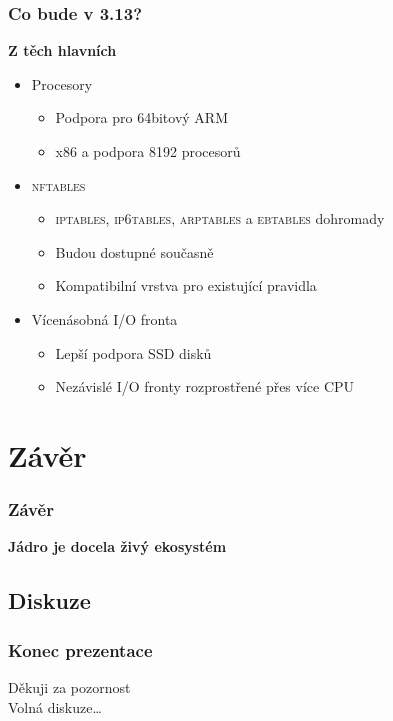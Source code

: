 \documentclass[xcolor=dvipsnames,handout]{beamer}
\newcommand{\heading}[1]{\textbf{\textcolor{BurntOrange}{#1}}}
\begin{document}
\begin{frame}
  \frametitle{Co bude v 3.13?}

  \heading{Z těch hlavních}
  \begin{itemize}
    \item Procesory
    \begin{itemize}
      \item Podpora pro 64bitový ARM
      \item x86 a podpora 8192 procesorů
    \end{itemize}

    \pause

    \item \textsc{nftables}
    \begin{itemize}
      \item \textsc{iptables}, \textsc{ip6tables}, \textsc{arptables} a
	\textsc{ebtables} dohromady
      \item Budou dostupné současně
      \item Kompatibilní vrstva pro existující pravidla
    \end{itemize}

    \pause

    \item Vícenásobná I/O fronta
    \begin{itemize}
      \item Lepší podpora SSD disků
      \item Nezávislé I/O fronty rozprostřené přes více CPU
    \end{itemize}
  \end{itemize}

\end{frame}

\section{Závěr}

\begin{frame}
  \frametitle{Závěr}

  \begin{center}
    \Large
    \heading{Jádro je docela živý ekosystém}
  \end{center}

\end{frame}

\subsection{Diskuze}

\begin{frame}
  \frametitle{Konec prezentace}

  \huge
  \begin{center}
  Děkuji za pozornost \\[1em]
  Volná diskuze\dots
  \end{center}

\end{frame}
\end{document}
